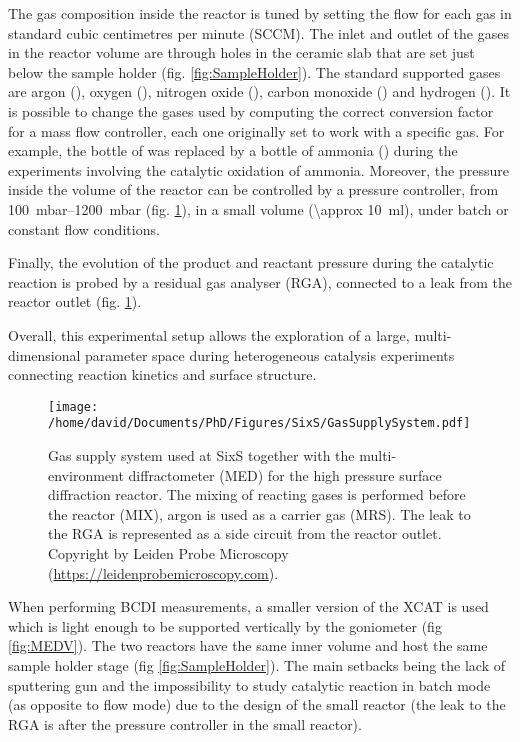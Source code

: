 The gas composition inside the reactor is tuned by setting the flow for each gas in standard cubic centimetres per minute (SCCM).
The inlet and outlet of the gases in the reactor volume are through holes in the ceramic slab that are set just below the sample holder (fig. \ref{fig:SampleHolder}).
The standard supported gases are argon (\argon), oxygen (\dioxygen), nitrogen oxide (\nitricoxide), carbon monoxide () and hydrogen ().
It is possible to change the gases used by computing the correct conversion factor for a mass flow controller, each one originally set to work with a specific gas.
For example, the bottle of  was replaced by a bottle of ammonia (\ammonia) during the experiments involving the catalytic oxidation of ammonia.
Moreover, the pressure inside the volume of the reactor can be controlled by a pressure controller, from \qtyrange{100}{1200}{\milli\bar} (fig. \ref{fig:GasSupplySystem}), in a small volume (\qty{\approx 10}{\ml}), under batch or constant flow conditions.

Finally, the evolution of the product and reactant pressure during the catalytic reaction is probed by a residual gas analyser (RGA), connected to a leak from the reactor outlet (fig. \ref{fig:GasSupplySystem}).

Overall, this experimental setup allows the exploration of a large, multi-dimensional parameter space during heterogeneous catalysis experiments connecting reaction kinetics and surface structure.

\begin{figure}[!htb]
    \centering
    \texttt{[image: /home/david/Documents/PhD/Figures/SixS/GasSupplySystem.pdf]}
    \caption{
    	Gas supply system used at SixS together with the multi-environment diffractometer (MED) for the high pressure surface diffraction reactor.
    	The mixing of reacting gases is performed before the reactor (MIX), argon is used as a carrier gas (MRS).
    	The leak to the RGA is represented as a side circuit from the reactor outlet.
    	Copyright by Leiden Probe Microscopy (\url{https://leidenprobemicroscopy.com}).
    }
    \label{fig:GasSupplySystem}
\end{figure}

When performing BCDI measurements, a smaller version of the XCAT is used which is light enough to be supported vertically by the goniometer (fig \ref{fig:MEDV}).
The two reactors have the same inner volume and host the same sample holder stage (fig \ref{fig:SampleHolder}).
The main setbacks being the lack of sputtering gun and the impossibility to study catalytic reaction in batch mode (as opposite to flow mode) due to the design of the small reactor (the leak to the RGA is after the pressure controller in the small reactor).

